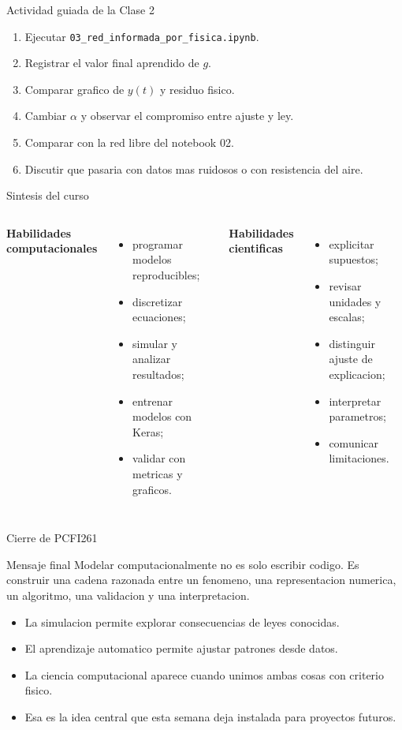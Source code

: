 \begin{frame}{Actividad guiada de la Clase 2}
\begin{enumerate}
    \item Ejecutar \texttt{03\_red\_informada\_por\_fisica.ipynb}.
    \item Registrar el valor final aprendido de $g$.
    \item Comparar grafico de $y(t)$ y residuo fisico.
    \item Cambiar $\alpha$ y observar el compromiso entre ajuste y ley.
    \item Comparar con la red libre del notebook 02.
    \item Discutir que pasaria con datos mas ruidosos o con resistencia del aire.
\end{enumerate}
\end{frame}

\begin{frame}{Sintesis del curso}
\begin{columns}[T,onlytextwidth]
\textbf{Habilidades computacionales}
\begin{itemize}
    \item programar modelos reproducibles;
    \item discretizar ecuaciones;
    \item simular y analizar resultados;
    \item entrenar modelos con Keras;
    \item validar con metricas y graficos.
\end{itemize}
\textbf{Habilidades cientificas}
\begin{itemize}
    \item explicitar supuestos;
    \item revisar unidades y escalas;
    \item distinguir ajuste de explicacion;
    \item interpretar parametros;
    \item comunicar limitaciones.
\end{itemize}
\end{columns}
\end{frame}

\begin{frame}{Cierre de PCFI261}
\begin{block}{Mensaje final}
Modelar computacionalmente no es solo escribir codigo. Es construir una cadena razonada entre un fenomeno, una representacion numerica, un algoritmo, una validacion y una interpretacion.
\end{block}
\begin{itemize}
    \item La simulacion permite explorar consecuencias de leyes conocidas.
    \item El aprendizaje automatico permite ajustar patrones desde datos.
    \item La ciencia computacional aparece cuando unimos ambas cosas con criterio fisico.
    \item Esa es la idea central que esta semana deja instalada para proyectos futuros.
\end{itemize}
\end{frame}


